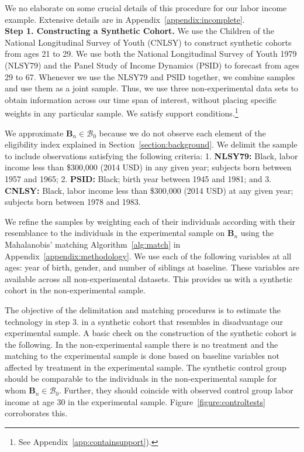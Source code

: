 We no elaborate on some crucial details of this procedure for our labor income example. Extensive details are in Appendix~\ref{appendix:incomplete}.\\

\noindent \textbf{Step 1. Constructing a Synthetic Cohort.} We use the Children of the National Longitudinal Survey of Youth (CNLSY) to construct synthetic cohorts from ages 21 to 29. We use both the National Longitudinal Survey of Youth 1979 (NLSY79) and the Panel Study of Income Dynamics (PSID) to forecast from ages 29 to 67. Whenever we use the NLSY79 and PSID together, we combine samples and use them as a joint sample. Thus, we use three non-experimental data sets to obtain information across our time span of interest, without placing specific weights in any particular sample. We satisfy support conditions.\footnote{See Appendix~\ref{app:containsupport}).}

We approximate $\bm{B}_{n} \in \mathcal{B}_0$ because we do not observe each element of the eligibility index explained in Section~\ref{section:background}. We delimit the sample to include observations satisfying the following criteria: 1. \textbf{NLSY79:} Black, labor income less than \$300,000 (2014 USD) in any given year; subjects born between 1957 and 1965; 2. \textbf{PSID:} Black; birth year between 1945 and 1981; and 3. \textbf{CNLSY:} Black, labor income less than \$300,000 (2014 USD) at any given year; subjects born between 1978 and 1983.

We refine the samples by weighting each of their individuals according with their resemblance to the individuals in the experimental sample on $\bm{B}_{n}$ using the Mahalanobis' matching Algorithm~\ref{alg:match} in Appendix~\ref{appendix:methodology}. We use each of the following variables at all ages: year of birth, gender, and number of siblings at baseline. These variables are available across all non-experimental datasets. This provides us with a synthetic cohort in the non-experimental sample.

The objective of the delimitation and matching procedures is to estimate the technology in step 3. in a synthetic cohort that resembles in disadvantage our experimental sample. A basic check on the construction of the synthetic cohort is the following. In the non-experimental sample there is no treatment and the matching to the experimental sample is done based on baseline variables not affected by treatment in the experimental sample. The synthetic control group should be comparable to the individuals in the non-experimental sample for whom $\bm{B}_{n} \in \mathcal{B}_0$. Further, they should coincide with observed control group labor income at age 30 in the experimental sample. Figure~\ref{figure:controltests} corroborates this.\\

